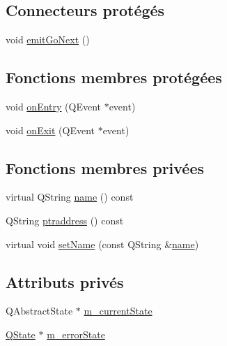 \subsection*{Connecteurs protégés}
\begin{DoxyCompactItemize}
\item 
void \hyperlink{classSH__GenericStateMachine_a2e162a1da1f694d433cb9072b37ac530}{emit\-Go\-Next} ()
\end{DoxyCompactItemize}
\subsection*{Fonctions membres protégées}
\begin{DoxyCompactItemize}
\item 
void \hyperlink{classSH__GenericStateMachine_adfd82f2532595ed7c4bcf21f03cbb951}{on\-Entry} (Q\-Event $\ast$event)
\item 
void \hyperlink{classSH__GenericStateMachine_a4b36d60fa1876908493d3d07f191a30f}{on\-Exit} (Q\-Event $\ast$event)
\end{DoxyCompactItemize}
\subsection*{Fonctions membres privées}
\begin{DoxyCompactItemize}
\item 
virtual Q\-String \hyperlink{classSH__NamedObject_a9f686c6f2a5bcc08ad03d0cee0151f0f}{name} () const 
\item 
Q\-String \hyperlink{classSH__NamedObject_a147d0e52d9f0fc1d3a423d02f82325f5}{ptraddress} () const 
\item 
virtual void \hyperlink{classSH__NamedObject_a6bc164e6fa10ae190770529af75d1775}{set\-Name} (const Q\-String \&\hyperlink{classSH__NamedObject_a9f686c6f2a5bcc08ad03d0cee0151f0f}{name})
\end{DoxyCompactItemize}
\subsection*{Attributs privés}
\begin{DoxyCompactItemize}
\item 
Q\-Abstract\-State $\ast$ \hyperlink{classSH__GenericStateMachine_a67b2e327c47acb0e3149b99e4ea1311e}{m\-\_\-current\-State}
\item 
\hyperlink{classQState}{Q\-State} $\ast$ \hyperlink{classSH__GenericStateMachine_acdf020d8c235f727096da9e613d7e4d7}{m\-\_\-error\-State}
\end{DoxyCompactItemize}


